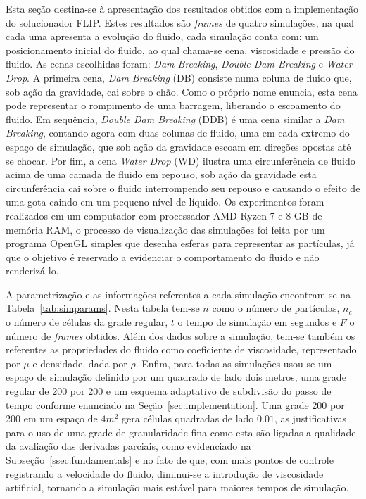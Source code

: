 \documentclass[12pt,a4paper,dvipsnames]{article}
\newcommand{\secref}[1]{Seção~\ref{#1}}
\newcommand{\tabref}[1]{Tabela~\ref{#1}}
\newcommand{\ssecref}[1]{Subseção~\ref{#1}}
\begin{document}
Esta seção destina-se à apresentação dos resultados obtidos com a implementação do solucionador FLIP. Estes resultados são \textit{frames} de quatro simulações, na qual cada uma apresenta a evolução do fluido, cada simulação conta com: um posicionamento inicial do fluido, ao qual chama-se cena, viscosidade e pressão do fluido. As cenas escolhidas foram: \textit{Dam Breaking}, \textit{Double Dam Breaking} e \textit{Water Drop}. A primeira cena, \textit{Dam Breaking} (DB) consiste numa coluna de fluido que, sob ação da gravidade, cai sobre o chão. Como o próprio nome enuncia, esta cena pode representar o rompimento de uma barragem, liberando o escoamento do fluido. Em sequência, \textit{Double Dam Breaking} (DDB) é uma cena similar a \textit{Dam Breaking}, contando agora com duas colunas de fluido, uma em cada extremo do espaço de simulação, que sob ação da gravidade escoam em direções opostas até se chocar. Por fim, a cena \textit{Water Drop} (WD) ilustra uma circunferência de fluido acima de uma camada de fluido em repouso, sob ação da gravidade esta circunferência cai sobre o fluido interrompendo seu repouso e causando o efeito de uma gota caindo em um pequeno nível de líquido. Os experimentos foram realizados em um computador com processador AMD Ryzen-7 e 8 GB de memória RAM, o processo de visualização das simulações foi feita por um programa OpenGL simples que desenha esferas para representar as partículas, já que o objetivo é reservado a evidenciar o comportamento do fluido e não renderizá-lo.

A parametrização e as informações referentes a cada simulação encontram-se na \tabref{tab:simparams}. Nesta tabela tem-se $n$ como o número de partículas, $n_c$ o número de células da grade regular, $t$ o tempo de simulação em segundos e $F$ o número de \textit{frames} obtidos. Além dos dados sobre a simulação, tem-se também os referentes as propriedades do fluido como coeficiente de viscosidade, representado por $\mu$ e densidade, dada por $\rho$. Enfim, para todas as simulações usou-se um espaço de simulação definido por um quadrado de lado dois metros, uma grade regular de 200 por 200 e um esquema adaptativo de subdivisão do passo de tempo conforme enunciado na \secref{sec:implementation}. Uma grade 200 por 200 em um espaço de $4m^2$ gera células quadradas de lado $0.01$, as justificativas para o uso de uma grade de granularidade fina como esta são ligadas a qualidade da avaliação das derivadas parciais, como evidenciado na \ssecref{ssec:fundamentals} e no fato de que, com mais pontos de controle registrando a velocidade do fluido, diminui-se a introdução de viscosidade artificial, tornando a simulação mais estável para maiores tempos de simulação.
\end{document}
